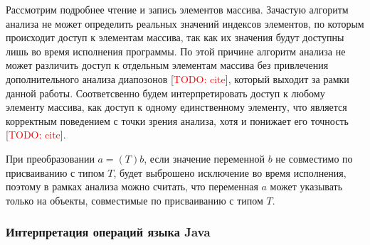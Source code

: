 \documentclass[14pt,titlepage]{extarticle}
\newcommand{\todo}[1]{\textcolor{red}{\eng{TODO}: #1}}
\newcommand{\todocite}{[\todo{cite}]}
\newcommand{\eng}[1]{{\English#1}}
\begin{document}
      Рассмотрим подробнее чтение и запись элементов массива. Зачастую
      алгоритм анализа не может определить реальных значений индексов
      элементов, по которым происходит доступ к элементам массива, так как их
      значения будут доступны лишь во время исполнения программы.
      По этой причине алгоритм анализа не может различить доступ к отдельным
      элементам массива без привлечения дополнительного анализа диапозонов
      \todocite, который выходит за рамки данной работы.
      Соответсвенно будем интерпретировать доступ к любому элементу массива,
      как доступ к одному единственному элементу, что является корректным
      поведением с точки зрения анализа, хотя и понижает его точность
      \todocite.

      При преобразовании $a = (T)b$, если значение переменной $b$ не совместимо
      по присваиванию с типом $T$, будет выброшено исключение во время
      исполнения, поэтому в рамках анализа можно считать, что переменная $a$
      может указывать только на объекты, совместимые по присваиванию с типом
      $T$.

      \subsubsection{Интерпретация операций языка Java}
\end{document}
